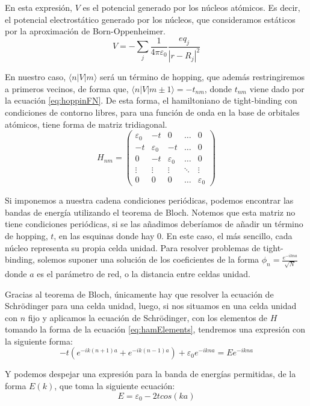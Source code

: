 \documentclass[12pt,twoside]{article}
\begin{document}
En esta expresión, $V$ es el potencial generado por los núcleos atómicos. Es decir, el potencial electrostático generado por los núcleos, que consideramos estáticos por la aproximación de Born-Oppenheimer.
$$
V = -\sum_j \frac{1}{4\pi\varepsilon_0}\frac{eq_j}{|r - R_j|^2}
$$

En nuestro caso, $\langle n | V | m \rangle$ será un término de hopping, que además restringiremos a primeros vecinos, de forma que, $\langle n | V | m\pm 1 \rangle = -t_{nm}$, donde $t_{nm}$ viene dado por la ecuación \ref{eq:hoppinFN}. De esta forma, el hamiltoniano de tight-binding con condiciones de contorno libres, para una función de onda en la base de orbitales atómicos, tiene forma de matriz tridiagonal.
\begin{equation}
  H_{nm} = \left(\begin{array}{ccccc}
    \varepsilon_0 & -t & 0 & \ldots & 0 \\
    -t & \varepsilon_0 & -t & \ldots & 0 \\
    0 & -t & \varepsilon_0 & \ldots & 0 \\
    \vdots & \vdots & \vdots & \ddots & \vdots \\
    0 & 0 & 0 & \ldots & \varepsilon_0
  \end{array}\right)
\end{equation}

Si imponemos a nuestra cadena condiciones periódicas, podemos encontrar las bandas de energía utilizando el teorema de Bloch. Notemos que esta matriz no tiene condiciones periódicas, si se las añadimos deberíamos de añadir un término de hopping, $t$, en las esquinas donde hay $0$. En este caso, el más sencillo, cada núcleo representa su propia celda unidad. Para resolver problemas de tight-binding, solemos suponer una solución de los coeficientes de la forma $\phi_n = \frac{e^{-ikna}}{\sqrt{N}}$ donde $a$ es el parámetro de red, o la distancia entre celdas unidad.

Gracias al teorema de Bloch, únicamente hay que resolver la ecuación de Schrödinger para una celda unidad, luego, si nos situamos en una celda unidad con $n$ fijo y aplicamos la ecuación de Schrödinger, con los elementos de $H$ tomando la forma de la ecuación \ref{eq:hamElements}, tendremos una expresión con la siguiente forma:
$$
-t(e^{-ik(n+1)a} + e^{-ik(n-1)a}) + \varepsilon_0e^{-ikna} = Ee^{-ikna}
$$

Y podemos despejar una expresión para la banda de energías permitidas, de la forma $E(k)$, que toma la siguiente ecuación:
\begin{equation}
  E = \varepsilon_0 - 2tcos(ka)
  \label{eq:bandasTB}
\end{equation}
\end{document}
